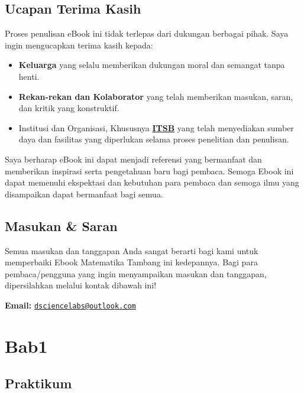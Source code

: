 \documentclass[
]{book}
\providecommand{\tightlist}{%
  \setlength{\itemsep}{0pt}\setlength{\parskip}{0pt}}
\begin{document}
\section*{Ucapan Terima Kasih}\label{ucapan-terima-kasih}

Proses penulisan eBook ini tidak terlepas dari dukungan berbagai pihak. Saya ingin mengucapkan terima kasih kepada:

\begin{itemize}
\tightlist
\item
  \textbf{Keluarga} yang selalu memberikan dukungan moral dan semangat tanpa henti.
\item
  \textbf{Rekan-rekan dan Kolaborator} yang telah memberikan masukan, saran, dan kritik yang konstruktif.
\item
  Institusi dan Organisasi, Khususnya \textbf{\href{https://itsb.ac.id/}{ITSB}} yang telah menyediakan sumber daya dan fasilitas yang diperlukan selama proses penelitian dan penulisan.
\end{itemize}

Saya berharap eBook ini dapat menjadi referensi yang bermanfaat dan memberikan inspirasi serta pengetahuan baru bagi pembaca. Semoga Ebook ini dapat memenuhi ekspektasi dan kebutuhan para pembaca dan semoga ilmu yang disampaikan dapat bermanfaat bagi semua.

\section*{Masukan \& Saran}\label{masukan-saran}

Semua masukan dan tanggapan Anda sangat berarti bagi kami untuk memperbaiki Ebook Matematika Tambang ini kedepannya. Bagi para pembaca/pengguna yang ingin menyampaikan masukan dan tanggapan, dipersilahkan melalui kontak dibawah ini!

\textbf{Email:} \href{mailto:dsciencelabs@outlook.com}{\nolinkurl{dsciencelabs@outlook.com}}

\chapter{Bab1}\label{bab1}

\section{Praktikum}\label{praktikum}
\end{document}

